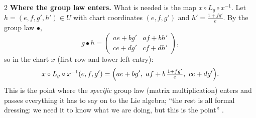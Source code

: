 \begin{paracol}{2}
\textbf{Where the group law enters.} What is needed is the map $x\circ L_g\circ x^{-1}$. Let $h=(e,f,g',h')\in U$ with chart coordinates $(e,f,g')$ and $h'=\frac{1+fg'}{e}$. By the group law $\bullet$,
\[
  g\bullet h=\begin{pmatrix}ae+bg'&af+bh'\\ce+dg'&cf+dh'\end{pmatrix},
\]
so in the chart $x$ (first row and lower-left entry):
\[
  x\circ L_g\circ x^{-1}(e,f,g')=\Bigl(ae+bg',\ af+b\,\tfrac{1+fg'}{e},\ ce+dg'\Bigr).
\]
This is the point where the \emph{specific} group law (matrix multiplication) enters and passes everything it has to say on to the Lie algebra; ``the rest is all formal dressing: we need it to know what we are doing, but this is the point''             .


\end{paracol}
